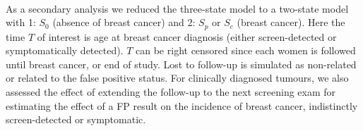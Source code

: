 \paragraph{} As a secondary analysis we reduced the three-state model to a two-state model with 1: $S_0$ (absence of breast cancer) and 2: $S_p$ or $S_c$ (breast cancer). Here the time $T$ of interest is age at breast cancer diagnosis (either screen-detected or symptomatically detected). $T$ can be right censored since each women is followed until breast cancer, or end of study. Lost to follow-up is simulated as non-related or related to the false positive status. For clinically diagnosed tumours, we also assessed the effect of extending the follow-up to the next screening exam for estimating the effect of a FP result on the incidence of breast cancer, indistinctly screen-detected or symptomatic.







